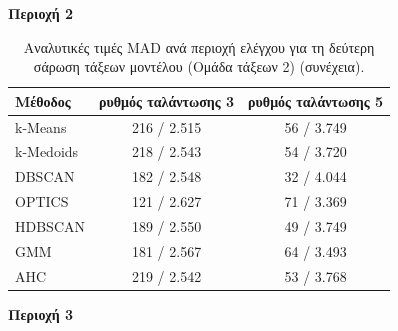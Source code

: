 \begin{table}[H]
    \ContinuedFloat
    \centering
    \caption[]{Αναλυτικές τιμές MAD ανά περιοχή ελέγχου για τη δεύτερη σάρωση τάξεων μοντέλου (Ομάδα τάξεων 2) (συνέχεια).}
    \footnotesize
    \setlength{\tabcolsep}{6.5pt}
    \renewcommand{\arraystretch}{1.08}

    \textbf{Περιοχή 2}\\[0.3em]
    \begin{tabular}{lcc}
        \toprule
        Μέθοδος & ρυθμός ταλάντωσης 3 & ρυθμός ταλάντωσης 5 \\
        \midrule
        k-Means   & 216 / 2.515 & 56 / 3.749 \\
        k-Medoids & 218 / 2.543 & 54 / 3.720 \\
        DBSCAN    & 182 / 2.548 & 32 / 4.044 \\
        OPTICS    & 121 / 2.627 & 71 / 3.369 \\
        HDBSCAN   & 189 / 2.550 & 49 / 3.749 \\
        GMM       & 181 / 2.567 & 64 / 3.493 \\
        AHC       & 219 / 2.542 & 53 / 3.768 \\
        \bottomrule
    \end{tabular}

    \vspace{0.8em}
    \textbf{Περιοχή 3}\\[0.3em]
\end{table}

